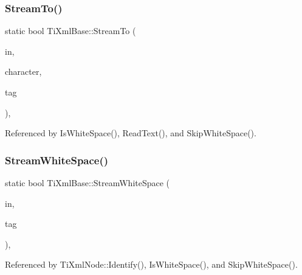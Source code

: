 \subsubsection{\texorpdfstring{Stream\+To()}{StreamTo()}}
{\footnotesize\ttfamily static bool Ti\+Xml\+Base\+::\+Stream\+To (\begin{DoxyParamCaption}\item[{std\+::istream $\ast$}]{in,  }\item[{int}]{character,  }\item[{\hyperlink{tinyxml_8h_a92bada05fd84d9a0c9a5bbe53de26887}{T\+I\+X\+M\+L\+\_\+\+S\+T\+R\+I\+NG} $\ast$}]{tag }\end{DoxyParamCaption})\hspace{0.3cm}{\ttfamily [static]}, {\ttfamily [protected]}}



Referenced by Is\+White\+Space(), Read\+Text(), and Skip\+White\+Space().

\hypertarget{class_ti_xml_base_aafe51421ca2f618d250a0541e8d61a4e}{}\label{class_ti_xml_base_aafe51421ca2f618d250a0541e8d61a4e} 
\subsubsection{\texorpdfstring{Stream\+White\+Space()}{StreamWhiteSpace()}}
{\footnotesize\ttfamily static bool Ti\+Xml\+Base\+::\+Stream\+White\+Space (\begin{DoxyParamCaption}\item[{std\+::istream $\ast$}]{in,  }\item[{\hyperlink{tinyxml_8h_a92bada05fd84d9a0c9a5bbe53de26887}{T\+I\+X\+M\+L\+\_\+\+S\+T\+R\+I\+NG} $\ast$}]{tag }\end{DoxyParamCaption})\hspace{0.3cm}{\ttfamily [static]}, {\ttfamily [protected]}}



Referenced by Ti\+Xml\+Node\+::\+Identify(), Is\+White\+Space(), and Skip\+White\+Space().

\hypertarget{class_ti_xml_base_a51631e6986179558b9e5850723ed165a}{}\label{class_ti_xml_base_a51631e6986179558b9e5850723ed165a} 
